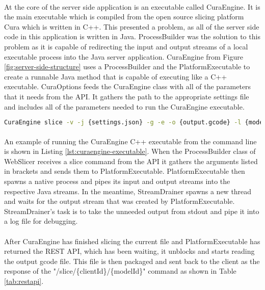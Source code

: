 \paragraph{}
At the core of the server side application is an executable called CuraEngine. 
It is the main executable which is compiled from the open source slicing platform Cura which is written in C++. 
This presented a problem, as all of the server side code in this application is written in Java. 
ProcessBuilder was the solution to this problem as it is capable of redirecting the input and output streams of a local executable process into the Java server application.
CuraEngine from Figure \ref{fig:server-side-structure} uses a ProcessBuilder and the PlatformExecutable to create a runnable Java method that is capable of executing like a C++ executable.
CuraOptions feeds the CuraEngine class with all of the parameters that it needs from the API.
It gathers the path to the appropriate settings file and includes all of the parameters needed to run the CuraEngine executable.

\begin{lstlisting}[language=bash, style=thesiscode, label={lst:curaengine-executable}, caption=An example of running CuraEngine C++ executable directly from the command line.]
CuraEngine slice -v -j {settings.json} -g -e -o {output.gcode} -l {model-file.stl}
\end{lstlisting}

\paragraph{}
An example of running the CuraEngine C++ executable from the command line is shown in Listing \ref{lst:curaengine-executable}.
When the ProcessBuilder class of WebSlicer receives a slice command from the API it gathers the arguments listed in brackets and sends them to PlatformExecutable.
PlatformExecutable then spawns a native process and pipes its input and output streams into the respective Java streams.
In the meantime, StreamDrainer spawns a new thread and waits for the output stream that was created by PlatformExecutable.
StreamDrainer's task is to take the unneeded output from stdout and pipe it into a log file for debugging.

\paragraph{}
After CuraEngine has finished slicing the current file and PlatformExecutable has returned the REST API, which has been waiting, it unblocks and starts reading the output gcode file.
This file is then packaged and sent back to the client as the response of the "/slice/\{clientId\}/\{modelId\}" command as shown in Table \ref{tab:restapi}.

